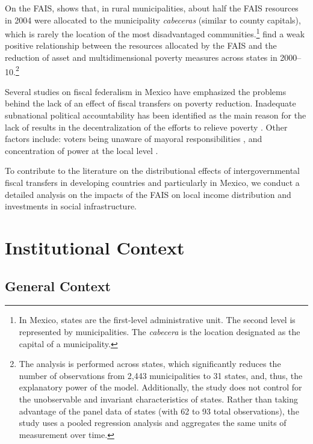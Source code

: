 \documentclass[dv_diss_main.tex]{subfiles}
\begin{document}
On the FAIS, \cite{guadarrama2008gasto} shows that, in rural municipalities, about half the FAIS resources in 2004 were allocated to the municipality \textit{cabeceras} (similar to county capitals), which is rarely the location of the most disadvantaged communities.\footnote{ In Mexico, states are the first-level administrative unit. The second level is represented by municipalities. The \textit{cabecera} is the location designated as the capital of a municipality.} \cite{ramones2014efectos} find a weak positive relationship between the resources allocated by the FAIS and the reduction of asset and multidimensional poverty measures across states in 2000–10.\footnote{ The analysis is performed across states, which significantly reduces the number of observations from 2,443 municipalities to 31 states, and, thus, the explanatory power of the model. Additionally, the study does not control for the unobservable and invariant characteristics of states. Rather than taking advantage of the panel data of states (with 62 to 93 total observations), the study uses a pooled regression analysis and aggregates the same units of measurement over time.}

Several studies on fiscal federalism in Mexico have emphasized the problems behind the lack of an effect of fiscal transfers on poverty reduction. Inadequate subnational political accountability has been identified as the main reason for the lack of results in the decentralization of the efforts to relieve poverty \citep{diaz2016fiscal,hernandez2016poverty}. Other factors include: voters being unaware of mayoral responsibilities \citep{chong2015does}, and concentration of power at the local level \citep{smith2016micro}. 

To contribute to the literature on the distributional effects of intergovernmental fiscal transfers in developing countries and particularly in Mexico, we conduct a detailed analysis on the impacts of the FAIS on local income distribution and investments in social infrastructure. 

\section{Institutional Context} \label{sec:institucinal}
\subsection{General Context} \label{subsec:general}
\end{document}
